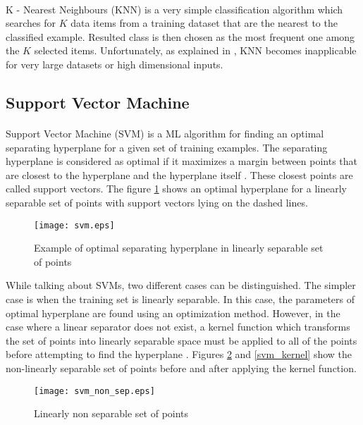 \paragraph{}
K - Nearest Neighbours (KNN) is a very simple classification algorithm which searches for $K$ data items from a training dataset that are the nearest to the classified example. Resulted class is then chosen as the most frequent one among the $K$ selected items. Unfortunately, as explained in \cite{ml_probabilistic}, KNN becomes inapplicable for very large datasets or  high dimensional inputs.

\subsection{Support Vector Machine}
\paragraph{}
Support Vector Machine (SVM) is a ML algorithm for finding an optimal separating hyperplane for a given set of training examples. The separating hyperplane is considered as optimal if it maximizes a margin between points that are closest to the hyperplane and the hyperplane itself \cite{ml_foundations}. These closest points are called support vectors. The figure \ref{svm_example} shows an optimal hyperplane for a linearly separable set of points with support vectors lying on the dashed lines. 

\begin{figure}[!h]
	\texttt{[image: svm.eps]}
	\centering
	\caption{Example of optimal separating hyperplane in linearly separable set of points}
	\label{svm_example}
\end{figure}

While talking about SVMs, two different cases can be distinguished. The simpler case is when the training set is linearly separable. In this case, the parameters of optimal hyperplane are found using an optimization method. However, in the case where a linear separator does not exist, a kernel function which transforms the set of points into linearly separable space must be applied to all  of the points before attempting to find the hyperplane \cite{ml_foundations}. Figures \ref{smv_non_sep} and \ref{svm_kernel} show the non-linearly separable set of points before and after applying the kernel function. 

\begin{figure}[!h]
	\texttt{[image: svm\_non\_sep.eps]}
	\centering
	\caption{Linearly non separable set of points}
	\label{smv_non_sep}
\end{figure}

